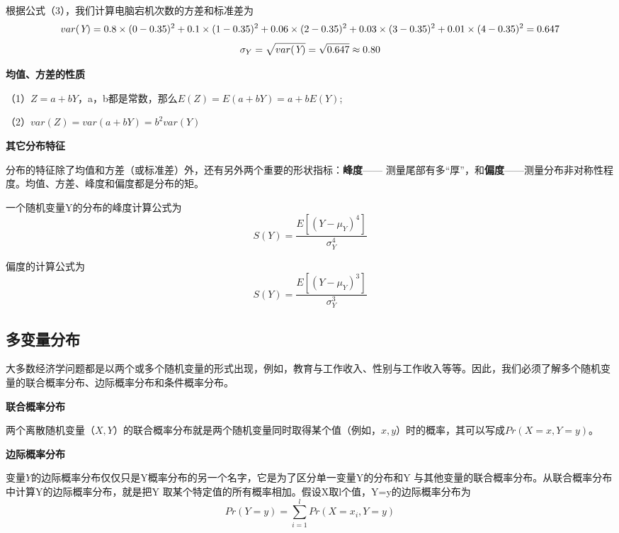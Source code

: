 \documentclass[cn,10pt,math=newtx,citestyle=gb7714-2015,bibstyle=gb7714-2015]{elegantbook}
\begin{document}
	根据公式（3），我们计算电脑宕机次数的方差和标准差为
	\begin{equation}
		var(\emph{Y})=0.8\times(0-0.35)^2+0.1\times(1-0.35)^2+0.06\times(2-0.35)^2+0.03\times(3-0.35)^2+0.01\times(4-0.35)^2=0.647
	\end{equation}
	\begin{equation}
		\sigma_{Y}=\sqrt{var(\emph{Y})}=\sqrt{0.647}\approx0.80
	\end{equation}
	
	\textbf{均值、方差的性质}
	
	（1）$Z=a+bY$，a，b都是常数，那么$E(Z)=E(a+bY)=a+bE(Y)$;
	
	（2）$var(Z)=var(a+bY)=b^2var(Y)$
	
	\textbf{其它分布特征}
	
	分布的特征除了均值和方差（或标准差）外，还有另外两个重要的形状指标：\textbf{峰度}—— 测量尾部有多“厚”，和\textbf{偏度}——测量分布非对称性程度。均值、方差、峰度和偏度都是分布的矩。
	
	一个随机变量Y的分布的峰度计算公式为
	\begin{equation}
		S(Y)=\frac{E\left[(Y-\mu_{Y})^4\right]}{\sigma_{Y}^4}
	\end{equation}
	
	偏度的计算公式为
	\begin{equation}
		S(Y)=\frac{E\left[(Y-\mu_{Y})^3\right]}{\sigma_{Y}^3}
	\end{equation}
	
	\subsection{多变量分布}
	大多数经济学问题都是以两个或多个随机变量的形式出现，例如，教育与工作收入、性别与工作收入等等。因此，我们必须了解多个随机变量的联合概率分布、边际概率分布和条件概率分布。
	
	\textbf{联合概率分布}
	
	两个离散随机变量（$X,Y$）的联合概率分布就是两个随机变量同时取得某个值（例如，$x,y$）时的概率，其可以写成$Pr(X=x,Y=y)$。
	
	\textbf{边际概率分布}
	
	变量$Y$的边际概率分布仅仅只是Y概率分布的另一个名字，它是为了区分单一变量Y的分布和Y 与其他变量的联合概率分布。从联合概率分布中计算Y的边际概率分布，就是把Y 取某个特定值的所有概率相加。假设X取l个值，Y=y的边际概率分布为
	\begin{equation}
		Pr(Y=y)=\sum_{i=1}^{l}{Pr(X=x_i,Y=y)}
	\end{equation}
	
\end{document}
